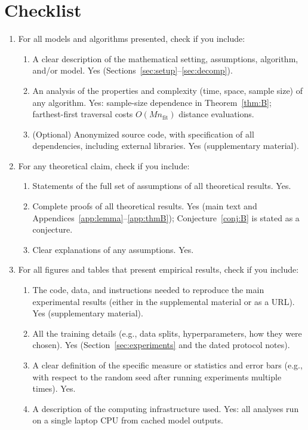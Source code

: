 \documentclass[twoside]{article}
\theoremstyle{definition}
\theoremstyle{remark}
\newcommand{\1}{\mathbf{1}}
\begin{document}
\section*{Checklist}
\begin{enumerate}
  \item For all models and algorithms presented, check if you include:
  \begin{enumerate}
    \item A clear description of the mathematical setting, assumptions, algorithm, and/or model. Yes (Sections~\ref{sec:setup}--\ref{sec:decomp}).
    \item An analysis of the properties and complexity (time, space, sample size) of any algorithm. Yes: sample-size dependence in Theorem~\ref{thm:B}; farthest-first traversal costs $O(Mn_{\mathrm{fit}})$ distance evaluations.
    \item (Optional) Anonymized source code, with specification of all dependencies, including external libraries. Yes (supplementary material).
  \end{enumerate}
  \item For any theoretical claim, check if you include:
  \begin{enumerate}
    \item Statements of the full set of assumptions of all theoretical results. Yes.
    \item Complete proofs of all theoretical results. Yes (main text and Appendices~\ref{app:lemma}--\ref{app:thmB}); Conjecture~\ref{conj:B} is stated as a conjecture.
    \item Clear explanations of any assumptions. Yes.
  \end{enumerate}
  \item For all figures and tables that present empirical results, check if you include:
  \begin{enumerate}
    \item The code, data, and instructions needed to reproduce the main experimental results (either in the supplemental material or as a URL). Yes (supplementary material).
    \item All the training details (e.g., data splits, hyperparameters, how they were chosen). Yes (Section~\ref{sec:experiments} and the dated protocol notes).
    \item A clear definition of the specific measure or statistics and error bars (e.g., with respect to the random seed after running experiments multiple times). Yes.
    \item A description of the computing infrastructure used. Yes: all analyses run on a single laptop CPU from cached model outputs.

\end{enumerate}
\end{enumerate}
\end{document}
